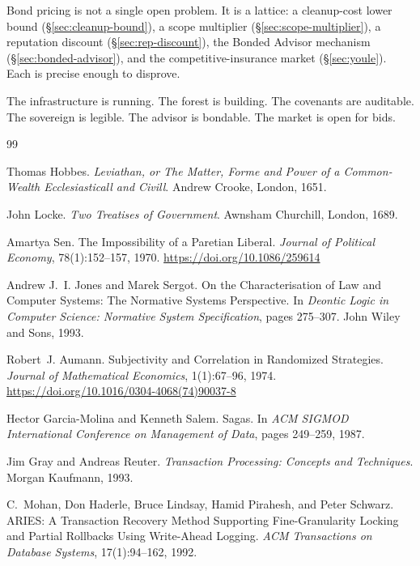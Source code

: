 \documentclass[11pt,a4paper]{article}
\theoremstyle{definition}
\theoremstyle{remark}
\begin{document}
Bond pricing is not a single open problem. It is a lattice: a cleanup-cost lower bound (\S\ref{sec:cleanup-bound}), a scope multiplier (\S\ref{sec:scope-multiplier}), a reputation discount (\S\ref{sec:rep-discount}), the Bonded Advisor mechanism (\S\ref{sec:bonded-advisor}), and the competitive-insurance market (\S\ref{sec:youle}). Each is precise enough to disprove.

The infrastructure is running. The forest is building. The covenants are auditable. The sovereign is legible. The advisor is bondable. The market is open for bids.


\begin{thebibliography}{99}

Thomas Hobbes.
\newblock \textit{Leviathan, or The Matter, Forme and Power of a Common-Wealth Ecclesiasticall and Civill}.
\newblock Andrew Crooke, London, 1651.

John Locke.
\newblock \textit{Two Treatises of Government}.
\newblock Awnsham Churchill, London, 1689.

Amartya Sen.
\newblock The Impossibility of a Paretian Liberal.
\newblock \textit{Journal of Political Economy}, 78(1):152--157, 1970.
\newblock \url{https://doi.org/10.1086/259614}

Andrew J.~I. Jones and Marek Sergot.
\newblock On the Characterisation of Law and Computer Systems: The Normative Systems Perspective.
\newblock In \textit{Deontic Logic in Computer Science: Normative System Specification}, pages 275--307. John Wiley and Sons, 1993.

Robert~J. Aumann.
\newblock Subjectivity and Correlation in Randomized Strategies.
\newblock \textit{Journal of Mathematical Economics}, 1(1):67--96, 1974.
\newblock \url{https://doi.org/10.1016/0304-4068(74)90037-8}

Hector Garcia-Molina and Kenneth Salem.
\newblock Sagas.
\newblock In \textit{ACM SIGMOD International Conference on Management of Data}, pages 249--259, 1987.

Jim Gray and Andreas Reuter.
\newblock \textit{Transaction Processing: Concepts and Techniques}.
\newblock Morgan Kaufmann, 1993.

C.~Mohan, Don Haderle, Bruce Lindsay, Hamid Pirahesh, and Peter Schwarz.
\newblock ARIES: A Transaction Recovery Method Supporting Fine-Granularity Locking and Partial Rollbacks Using Write-Ahead Logging.
\newblock \textit{ACM Transactions on Database Systems}, 17(1):94--162, 1992.


\end{thebibliography}
\end{document}

